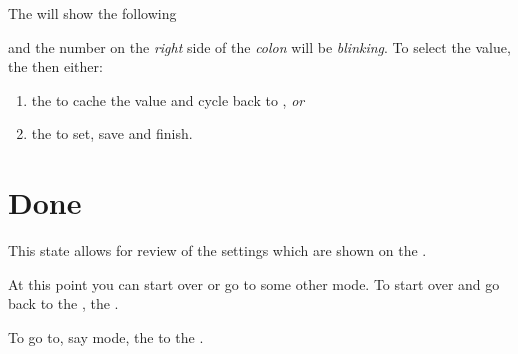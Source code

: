 The  will show the following

\begin{figure}[H]
\centering
\end{figure}

and the number on the \textit{right} side of the \textit{colon} will be
\textit{blinking}.  To select the  value,  the  then
either:

\begin{enumerate}
  \item {} the  to cache the value and cycle back to ,
    \textit{or}
  \item {} the  to set, save and finish.
\end{enumerate}


\section{Done} 

This state allows for review of the settings which are shown on the .

\par\medskip

At this point you can start over or go to some other mode.  To start over and go
back to the ,  the .


To go to, say  mode,  the  to the .


